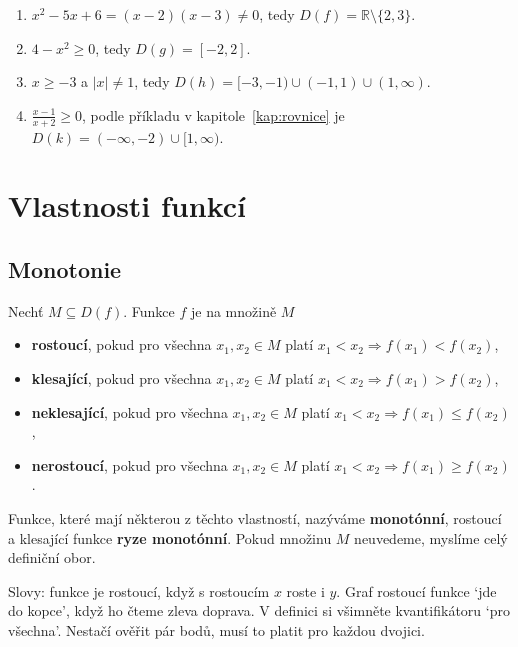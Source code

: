 \begin{solution}
  \begin{enumerate}[label=(\alph*)]
    \item $x^2 - 5x + 6 = (x - 2)(x - 3)\neq 0$, tedy $D(f) = \mathbb{R}\setminus\{2, 3\}$.
    \item $4 - x^2\geq 0$, tedy $D(g) = [-2, 2]$.
    \item $x\geq -3$ a $|x|\neq 1$, tedy $D(h) = [-3, -1)\cup(-1, 1)\cup(1, \infty)$.
    \item $\frac{x - 1}{x + 2}\geq 0$, podle příkladu v kapitole~\ref{kap:rovnice} je $D(k) = (-\infty, -2)\cup[1, \infty)$.
  \end{enumerate}
\end{solution}

\section{Vlastnosti funkcí}

\subsection{Monotonie}\label{sec:monotonie}

\begin{definitionbox}
  Nechť $M\subseteq D(f)$. Funkce $f$ je na množině $M$
  \begin{itemize}
    \item \textbf{rostoucí}, pokud pro všechna $x_1, x_2\in M$ platí $x_1 < x_2\Rightarrow f(x_1) < f(x_2)$,
    \item \textbf{klesající}, pokud pro všechna $x_1, x_2\in M$ platí $x_1 < x_2\Rightarrow f(x_1) > f(x_2)$,
    \item \textbf{neklesající}, pokud pro všechna $x_1, x_2\in M$ platí $x_1 < x_2\Rightarrow f(x_1)\leq f(x_2)$,
    \item \textbf{nerostoucí}, pokud pro všechna $x_1, x_2\in M$ platí $x_1 < x_2\Rightarrow f(x_1)\geq f(x_2)$.
  \end{itemize}
  Funkce, které mají některou z těchto vlastností, nazýváme \textbf{monotónní}, rostoucí a klesající funkce \textbf{ryze monotónní}. Pokud množinu $M$ neuvedeme, myslíme celý definiční obor.
\end{definitionbox}

Slovy: funkce je rostoucí, když s rostoucím $x$ roste i $y$. Graf rostoucí funkce `jde do kopce', když ho čteme zleva doprava. V definici si všimněte kvantifikátoru `pro všechna'. Nestačí ověřit pár bodů, musí to platit pro každou dvojici.

